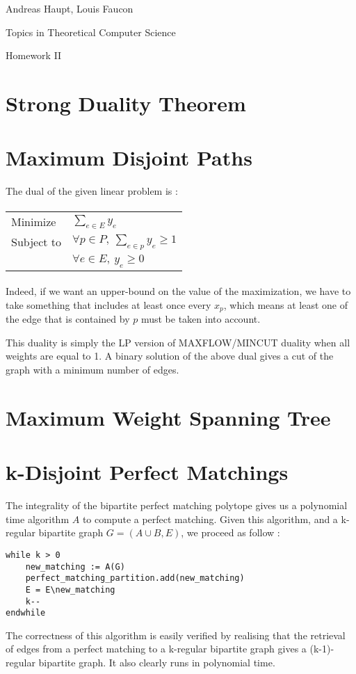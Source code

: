 \documentclass{scrartcl}
\newcommand\1{\mathbf{1}}
\begin{document}
Andreas Haupt, Louis Faucon

Topics in Theoretical Computer Science 

Homework II

\section{Strong Duality Theorem}

\section{Maximum Disjoint Paths}

The dual of the given linear problem is :

\paragraph{}
\begin{tabular}{ll}
Minimize & $\sum_{e \in E} y_e$\\
Subject to & $\forall p \in P, \ \sum_{e \in p} y_e \geq 1$\\
& $\forall e \in E, \  y_e \geq 0$ \\
\end{tabular}
\paragraph{} 

Indeed, if we want an upper-bound on the value of the maximization, we have to take something that includes at least once every $x_p$, which means at least one of the edge that is contained by $p$ must be taken into account. 

This duality is simply the LP version of MAXFLOW/MINCUT duality when all weights are equal to 1. A binary solution of the above dual gives a cut of the graph with a minimum number of edges.

\section{Maximum Weight Spanning Tree}

\section{k-Disjoint Perfect Matchings}

The integrality of the bipartite perfect matching polytope gives us a polynomial time algorithm $A$ to compute a perfect matching. Given this algorithm, and a k-regular bipartite graph $G = (A \cup B,E)$, we proceed as follow :

\begin{verbatim}
while k > 0
    new_matching := A(G) 
    perfect_matching_partition.add(new_matching)
    E = E\new_matching
    k--
endwhile
\end{verbatim}

The correctness of this algorithm is easily verified by realising that the retrieval of edges from a perfect matching to a k-regular bipartite graph gives a (k-1)-regular bipartite graph. It also clearly runs in polynomial time.
\end{document}
